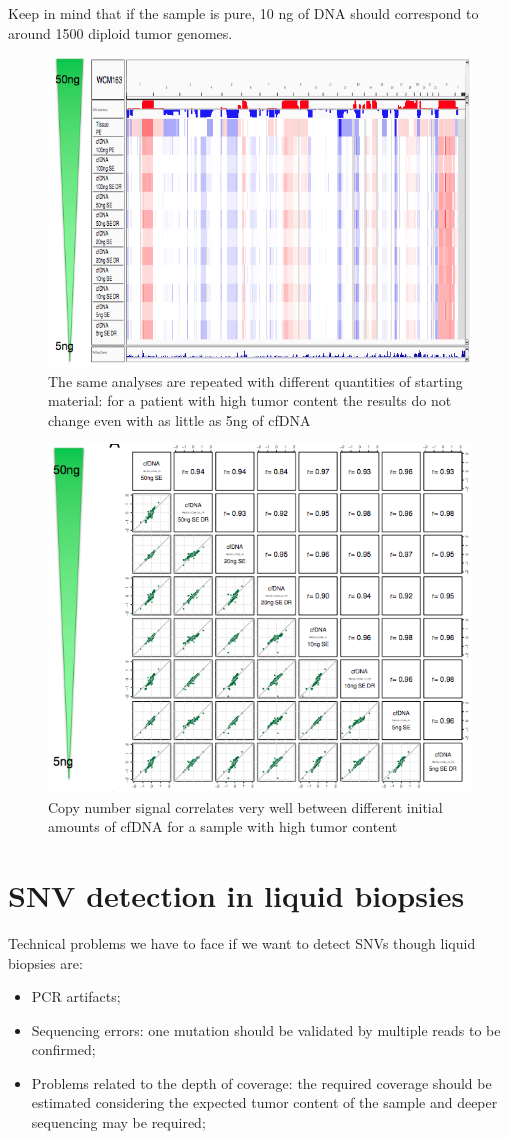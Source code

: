Keep in mind that if the sample is pure, 10 ng of DNA should correspond to around 1500 diploid tumor genomes.

\begin{figure}[H]
    \centering
    \includegraphics[width=0.5\linewidth]{quantity1.png}
    \caption{The same analyses are repeated with different quantities of starting material: for a patient with high tumor content the results do not change even with as little as 5ng of cfDNA}
    \label{fig:quan}
\end{figure}

\begin{figure}[H]
    \centering
    \includegraphics[width=0.7\linewidth]{quantity2.png}
    \caption{Copy number signal correlates very well between different initial amounts of cfDNA for a sample with high tumor content}
    \label{fig:quan2}
\end{figure}



\section{SNV detection in liquid biopsies}
Technical problems we have to face if we want to detect SNVs though liquid biopsies are:
\begin{itemize}
    \item PCR artifacts;
    \item Sequencing errors: one mutation should be validated by multiple reads to be confirmed;
    \item Problems related to the depth of coverage: the required coverage should be estimated considering the expected tumor content of the sample and deeper sequencing may be required;
\end{itemize}

